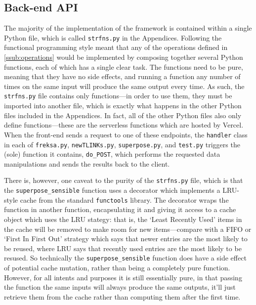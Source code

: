 \documentclass[a4paper,12pt,leqno]{article}
\begin{document}
\subsection{Back-end API}\label{sub:backend} %
The majority of the implementation of the framework is contained within a single Python file, which is called \verb|strfns.py| in the Appendices. Following the functional programming style meant that any of the operations defined in \cref{ssub:operations} would be implemented by composing together several Python functions, each of which has a single clear task. The functions need to be pure, meaning that they have no side effects, and running a function any number of times on the same input will produce the same output every time. As such, the \verb|strfns.py| file contains only functions---in order to use them, they must be imported into another file, which is exactly what happens in the other Python files included in the Appendices. In fact, all of the other Python files also only define functions---these are the serverless functions which are hosted by Vercel. When the front-end sends a request to one of these endpoints, the \verb|handler| class in each of \verb|freksa.py|, \verb|newTLINKs.py|, \verb|superpose.py|, and \verb|test.py| triggers the (sole) function it contains, \verb|do_POST|, which performs the requested data manipulations and sends the results back to the client.

There is, however, one caveat to the purity of the \verb|strfns.py| file, which is that the \verb|superpose_sensible| function uses a decorator which implements a LRU-style cache from the standard \verb|functools| library. The decorator wraps the function in another function, encapsulating it and giving it access to a cache object which uses the LRU stategy: that is, the `Least Recently Used' items in the cache will be removed to make room for new items---compare with a FIFO or `First In First Out' strategy which says that newer entries are the most likely to be reused, where LRU says that recently used entries are the most likely to be resused. So technically the \verb|superpose_sensible| function does have a side effect of potential cache mutation, rather than being a completely pure function. However, for all intents and purposes it is still essentially pure, in that passing the function the same inputs will always produce the same outputs, it'll just retrieve them from the cache rather than computing them after the first time.
\end{document}
